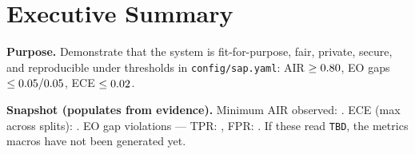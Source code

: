 
\section{Executive Summary}
\textbf{Purpose.} Demonstrate that the system is fit-for-purpose, fair, private, secure, and reproducible under thresholds in \texttt{config/sap.yaml}: AIR $\ge 0.80$, EO gaps $\le 0.05/0.05$, ECE $\le 0.02$.

\textbf{Snapshot (populates from evidence).}
Minimum AIR observed: \MinAIR. ECE (max across splits): \MaxECE. EO gap violations --- TPR: \NumTPRGapViol, FPR: \NumFPRGapViol. 
If these read \texttt{TBD}, the metrics macros have not been generated yet.
